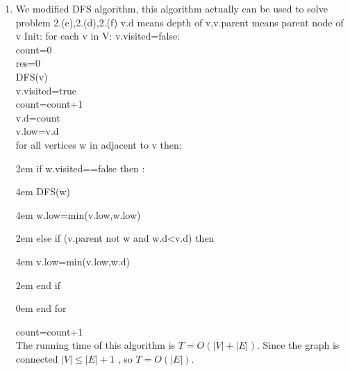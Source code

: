 \documentclass[paper=a4, fontsize=11pt]{scrartcl} %
\numberwithin{equation}{section} %
\numberwithin{figure}{section} %
\numberwithin{table}{section} %
\begin{document}
\begin{enumerate}[label={2.(\alph*)}]
  \item

We modified DFS algorithm, this algorithm actually can be used to solve problem 2.(c),2.(d),2.(f)
v.d means depth of v,v.parent means parent node of v
Init: for each v in V: v.visited=false:\\
count=0\\
res=0\\
DFS(v)\\
	v.visited=true\\
	count=count+1\\
	v.d=count\\
	v.low=v.d\\
	for all vertices w in adjacent to v then: \par
		\setlength{\parindent} {2em} if w.visited==false then :\par
			\setlength{\parindent} {4em} DFS(w)\par
			\setlength{\parindent} {4em} w.low=min(v.low,w.low) \par
		\setlength{\parindent} {2em} else if (v.parent not w and w.d<v.d) then \par
			\setlength{\parindent} {4em} v.low=min(v.low,w.d) \par
		\setlength{\parindent} {2em} end if  \par
\setlength{\parindent} {0em} end for \par
count=count+1\\
The running time of this algorithm is $T = O(|V | + |E|)$. Since the graph is connected ${ |V | \leq |E| + 1 }$ , so $T = O(|E|)$.


\end{enumerate}
\end{document}
